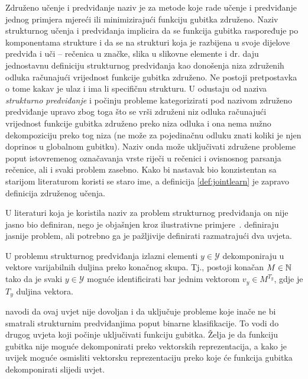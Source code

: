 Združeno učenje i predviđanje  naziv je za
metode koje rade učenje i predviđanje jednog primjera mjereći ili minimizirajući
funkciju gubitka združeno. Naziv strukturnog učenja i predviđanja
 implicira da se funkcija gubitka
raspoređuje po komponentama strukture i da se na strukturi koja je razbijena u
svoje dijelove predviđa i uči -- rečenica u značke, slika u slikovne elemente
i dr. \citet{daume14lts} daju jednostavnu definiciju strukturnog predviđanja kao
donošenja niza združenih odluka računajući vrijednost funkcije gubitka združeno.
Ne postoji pretpostavka o tome kakav je ulaz i ima li specifičnu strukturu. U
\citep{daume14lts, daume15naacltalk} odustaju od naziva \emph{strukturno
predviđanje} i počinju probleme kategorizirati pod nazivom združeno predviđanje
upravo zbog toga što se vrši združeni niz odluka računajući vrijednost
funkcije gubitka združeno preko niza odluka i ona nema nužno dekompoziciju preko
tog niza (ne može za pojedinačnu odluku znati koliki je njen doprinos u
globalnom gubitku). Naziv onda može uključivati združene probleme poput
istovremenog označavanja vrste riječi u rečenici i ovisnosnog parsanja
rečenice, ali i svaki problem zasebno. Kako bi nastavak bio konzistentan sa
starijom literaturom koristi se staro ime, a definicija \ref{def:jointlearn} je
zapravo definicija združenog učenja.

U literaturi koja je koristila naziv za problem strukturnog predviđanja on
nije jasno bio definiran, nego je objašnjen kroz ilustrativne
primjere~\citep{mccallum2000maximum, punyakanok2001use, lafferty2001conditional,
collins2002discriminative, taskar2003maximum, mcallester2004case,
tsochantaridis2005large}. \citet{daume09searn} definiraju jasnije problem, ali
potrebno ga je pažljivije definirati razmatrajući dva uvjeta.

\begin{condition}\label{uvjet1}

  U problemu strukturnog predviđanja izlazni elementi $y \in \mathcal{Y}$
  dekomponiraju u vektore varijabilnih duljina preko konačnog skupa. Tj.,
  postoji konačan $M \in \mathbb{N}$ tako da je svaki $y \in \mathcal{Y}$ moguće
  identificirati bar jednim vektorom $v_y \in M^{T_y}$, gdje je $T_y$ duljina
  vektora.

\end{condition}

\noindent
\citeauthor{daume06thesis} navodi da ovaj uvjet nije dovoljan i da uključuje
probleme koje inače ne bi smatrali strukturnim predviđanjima poput binarne
klasifikacije. To vodi do drugog uvjeta koji počinje uključivati funkciju
gubitka. Želja je da funkciju gubitka nije moguće dekomponirati preko vektorskih
reprezentacija, a kako je uvijek moguće osmisliti vektorsku reprezentaciju preko
koje će funkcija gubitka dekomponirati slijedi uvjet.

